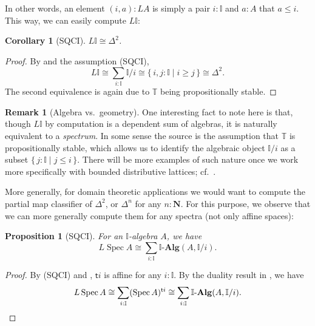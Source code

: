 \documentclass[a4paper,12pt]{amsart}
\newtheorem{corollary}[theorem]{Corollary}
\newtheorem{proposition}[theorem]{Proposition}
\theoremstyle{definition}
\newtheorem{remark}[theorem]{Remark}
\newtheorem*{axiom}{Axiom}
\newcommand{\mb}[1]{\mathbf{#1}}
\newcommand{\mbb}[1]{\mathbb{#1}}
\newcommand{\T}{\mbb T}
\newcommand{\I}{\mbb I}
\newcommand{\ms}[1]{\mathsf{#1}}
\newcommand{\alg}{\text{-}\mb{Alg}}
\newcommand{\scomp}[2]{\{\,#1\mid#2\,\}}
\newcommand{\N}{\mb N}
\newcommand{\spec}{\operatorname{Spec}}
\begin{document}
In other words, an element $(i,a) : L A$ is simply a pair $i : \I$ and $a : A$ that $a \le i$. This way, we can easily compute $L \I$:

\begin{corollary}[SQCI]
  $L \I \cong \Delta^2$.
\end{corollary}
\begin{proof}
  By  and the assumption (SQCI),
  \[ L\I \cong \sum_{i:\I}\I/i \cong \scomp{i,j : \I}{i \ge j} \cong \Delta^2. \]
  The second equivalence is again due to $\T$ being propositionally stable.
\end{proof}

\begin{remark}[Algebra vs.\ geometry]\label{rem:alggeoI}
  One interesting fact to note here is that, though $L\I$ by computation is a dependent sum of algebras, it is naturally equivalent to a \emph{spectrum}. In some sense the source is the assumption that $\T$ is propositionally stable, which allows us to identify the algebraic object $\I/i$ as a subset $\scomp{j : \I}{j \le i}$. There will be more examples of such nature once we work more specifically with bounded distributive lattices; cf.\ .
\end{remark}

More generally, for domain theoretic applications we would want to compute the partial map classifier of $\Delta^2$, or $\Delta^n$ for any $n:\N$. For this purpose, we observe that we can more generally compute them for any spectra (not only affine spaces):

\begin{proposition}[SQCI]\label{prop:liftofaffine}
  For an $\I$-algebra $A$, we have
  \[ L\spec A \cong \sum_{i:\I}\I\alg(A,\I/i). \]
\end{proposition}
\begin{proof}
  By (SQCI) and , $\ms ti$ is affine for any $i:\I$. By the duality result in , we have
  \[ L\spec A \cong \sum_{i:\I}(\spec A)^{\ms ti}\cong \sum_{i:\I}\I\alg(A,\I/i). \qedhere \]
\end{proof}


\end{document}
